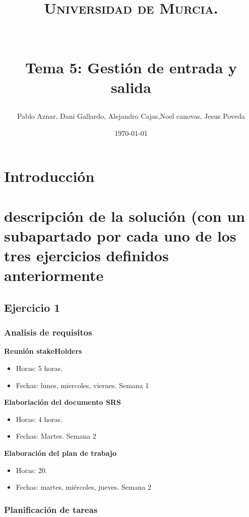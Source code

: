 \documentclass[paper=a4, fontsize=11pt, spanish]{scrartcl}
\title{
  \normalfont \normalsize 

  \textsc{Universidad de Murcia.} \\ [25pt] %
    
  \textbf{ \LARGE } \\ [25pt]
  
  \horrule{0.5pt} \\[0.4cm] %
  
  \huge Tema 5: Gestión de entrada y salida  
  \horrule{2pt} \\[0.5cm] %
}
\author{Pablo Aznar, Dani Gallardo, Alejandro Cajas,Noel canovas, Jesus Poveda} %
\date{\normalsize\today} %
\numberwithin{equation}{section} %
\numberwithin{figure}{section} %
\numberwithin{table}{section} %
\begin{document}
\maketitle %

\newpage %
\tableofcontents
\newpage %

\section{Introducción}

\section{descripción de la solución (con un
subapartado por cada uno de los tres ejercicios definidos anteriormente}

\subsection{Ejercicio 1}

\subsubsection{Analisis de requisitos}



\textbf{Reunión stakeHolders}
 \begin{itemize}
   \item Horas: 5 horas.  
   \item Fechas: lunes, miercoles, viernes. Semana 1
 \end{itemize}

 \textbf{Elaboriación del documento SRS}
 \begin{itemize}
   \item Horas: 4 horas.  
   \item Fechas: Martes. Semana 2
 \end{itemize}

\textbf{Elaboración del plan de trabajo}
\begin{itemize}
  \item Horas: 20.
  \item Fechas: martes, miércoles, jueves. Semana 2
\end{itemize}

\subsubsection{Planificación de tareas}
\end{document}
